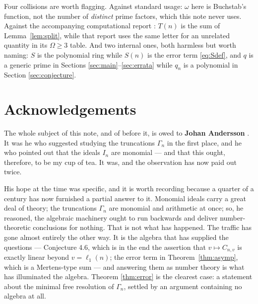 \documentclass[a4paper,11pt,oneside,reqno]{amsart}
\theoremstyle{definition}
\theoremstyle{remark}
\theoremstyle{plain}
\newcommand{\Om}{\Omega}
\newcommand{\Gam}{\Gamma}
\begin{document}
\endgroup

Four collisions are worth flagging. Against standard usage: \(\omega\) here is
Buchstab's function, not the number of \emph{distinct} prime factors, which this
note never uses. Against the accompanying computational report \cite{gitrepo}:
\(T(n)\) is the sum of Lemma~\ref{lem:split}, while that report uses the same
letter for an unrelated quantity in its \(\Om \ge 3\) table. And two internal ones,
both harmless but worth naming: \(S\) is the polynomial ring while \(S(n)\) is
the error term \eqref{eq:Sdef}, and \(q\) is a generic prime in Sections
\ref{sec:main}--\ref{sec:errata} while \(q_n\) is a polynomial in Section
\ref{sec:conjecture}.

\section*{Acknowledgements}

The whole subject of this note, and of \cite{Snellman2000} before it, is owed
to \textbf{Johan Andersson} . It was he who
suggested studying the truncations \(\Gam_n\) in the first place, and he who
pointed out that the ideals \(I_n\) are monomial --- and that this ought,
therefore, to be my cup of tea. It was, and the observation has now paid out
twice.

His hope at the time was specific, and it is worth recording because a quarter
of a century has now furnished a partial answer to it. Monomial ideals carry a
great deal of theory; the truncations \(\Gam_n\) are monomial and arithmetic at
once; so, he reasoned, the algebraic machinery ought to run backwards and
deliver number-theoretic conclusions for nothing. That is not what has happened.
The traffic has gone almost entirely the other way. It is the algebra that has
supplied the questions --- Conjecture 4.6, which is in the end the assertion
that \(v\mapsto C_{n,v}\) is exactly linear beyond \(v = \ell_1(n)\); the error
term in Theorem~\ref{thm:asymp}, which is a Mertens-type sum --- and answering
them as number theory is what has illuminated the algebra. Theorem
\ref{thm:error} is the clearest case: a statement about the minimal free
resolution of \(\Gam_n\), settled by an argument containing no algebra at all.
\end{document}

